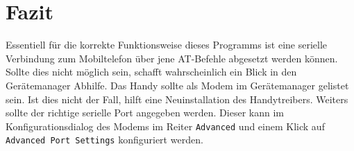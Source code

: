 \documentclass[paper=a4, fontsize=11pt]{scrartcl}
\begin{document}
 \section{Fazit}
Essentiell für die korrekte Funktionsweise dieses Programms ist eine serielle Verbindung zum Mobiltelefon über jene AT-Befehle abgesetzt werden können. 
Sollte dies nicht möglich sein, schafft wahrscheinlich ein Blick in den Gerätemanager Abhilfe. Das Handy sollte als Modem im Gerätemanager gelistet sein. 
Ist dies nicht der Fall, hilft eine Neuinstallation des Handytreibers. Weiters sollte der richtige serielle Port angegeben werden. Dieser kann im Konfigurationsdialog
des Modems im Reiter \texttt{Advanced} und einem Klick auf \texttt{Advanced Port Settings} konfiguriert werden. 

\newpage


\end{document}
